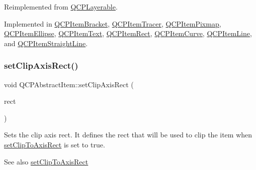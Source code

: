 Reimplemented from \hyperlink{classQCPLayerable_a04db8351fefd44cfdb77958e75c6288e}{Q\+C\+P\+Layerable}.



Implemented in \hyperlink{classQCPItemBracket_a49a6b2f41e0a8c2a2e3a2836027a8455}{Q\+C\+P\+Item\+Bracket}, \hyperlink{classQCPItemTracer_a9fd955fea40e977d66f3a9fd5765aec4}{Q\+C\+P\+Item\+Tracer}, \hyperlink{classQCPItemPixmap_a65d1ede7bb479b90d40186d083071947}{Q\+C\+P\+Item\+Pixmap}, \hyperlink{classQCPItemEllipse_ab6e2b8a29695c606c7731e498297ca29}{Q\+C\+P\+Item\+Ellipse}, \hyperlink{classQCPItemText_a676aaec10ad3cc4d7d0e4847db04c838}{Q\+C\+P\+Item\+Text}, \hyperlink{classQCPItemRect_a2e68621b75bae4da6ae0ab2cdd0dd733}{Q\+C\+P\+Item\+Rect}, \hyperlink{classQCPItemCurve_a718fa40140a43c8afbd41a3d85c92d72}{Q\+C\+P\+Item\+Curve}, \hyperlink{classQCPItemLine_a8e02bfbca04fbcf3dbc375a2bf693229}{Q\+C\+P\+Item\+Line}, and \hyperlink{classQCPItemStraightLine_a2e36c9d4dcc3aeda78a5584f790e39e3}{Q\+C\+P\+Item\+Straight\+Line}.

\mbox{\label{classQCPAbstractItem_a7dc75fcbcd10206fe0b75d757ea7a347}} 
\subsubsection{\texorpdfstring{set\+Clip\+Axis\+Rect()}{setClipAxisRect()}}
{\footnotesize\ttfamily void Q\+C\+P\+Abstract\+Item\+::set\+Clip\+Axis\+Rect (\begin{DoxyParamCaption}\item[{\hyperlink{classQCPAxisRect}{Q\+C\+P\+Axis\+Rect} $\ast$}]{rect }\end{DoxyParamCaption})}

Sets the clip axis rect. It defines the rect that will be used to clip the item when \hyperlink{classQCPAbstractItem_a39e05b9d4176b9accafc746d16ca6a06}{set\+Clip\+To\+Axis\+Rect} is set to true.

\begin{DoxySeeAlso}{See also}
\hyperlink{classQCPAbstractItem_a39e05b9d4176b9accafc746d16ca6a06}{set\+Clip\+To\+Axis\+Rect} 
\end{DoxySeeAlso}
\mbox{\label{classQCPAbstractItem_a39e05b9d4176b9accafc746d16ca6a06}} 
